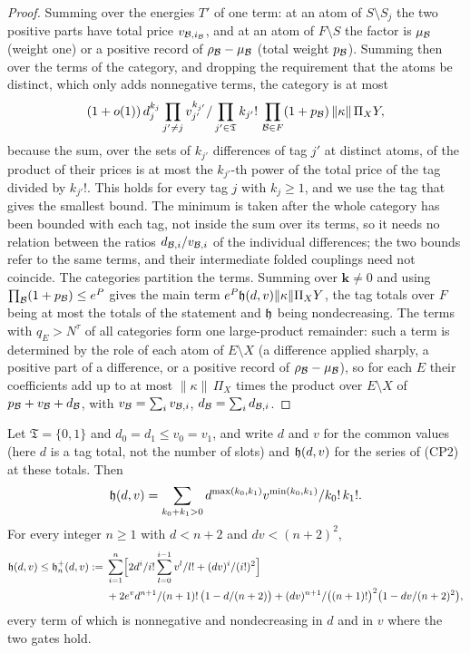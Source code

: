 \begin{proof}
Summing over the energies $T'$ of one term: at an atom of $S\setminus S_j$
the two positive parts have total price $v_{\mathcal B,i_\mathcal B}$, and at an atom of
$F\setminus S$ the factor is $\mu_\mathcal B$ (weight one) or a positive record of
$\rho_\mathcal B-\mu_\mathcal B$ (total weight $p_\mathcal B$). Summing then over the terms of
the category, and dropping the requirement that the atoms be distinct, which
only adds nonnegative terms, the category is at most
\[
 (1+o(1))\,d_j^{k_j}\prod_{j'\ne j}v_{j'}^{k_{j'}}/\prod_{j'\in\mathfrak T}k_{j'}!\,\prod_{\mathcal B\in F}(1+p_\mathcal B)\,
 \|\kappa\|\,\Pi_XY ,
\]
because the sum, over the sets of $k_{j'}$ differences of tag $j'$ at
distinct atoms, of the product of their prices is at most the $k_{j'}$-th
power of the total price of the tag divided by $k_{j'}!$. This holds for
every tag $j$ with $k_j\ge1$, and we use the tag that gives the smallest
bound. The minimum is taken after the whole category has been bounded with
each tag, not inside the sum over its terms, so it needs no relation between
the ratios $d_{\mathcal B,i}/v_{\mathcal B,i}$ of the individual differences; the two
bounds refer to the same terms, and their intermediate folded couplings need
not coincide. The categories partition the terms. Summing over
$\boldsymbol k\ne0$ and using $\prod_\mathcal B(1+p_\mathcal B)\le e^P$ gives the main
term $e^P\mathfrak h(d,v)\|\kappa\|\Pi_XY$, the tag totals over $F$ being at most
the totals of the statement and $\mathfrak h$ being nondecreasing. The terms with
$q_E>N^\tau$ of all categories form one large-product remainder: such a term
is determined by the role of each atom of $E\setminus X$ (a difference
applied sharply, a positive part of a difference, or a positive record of
$\rho_\mathcal B-\mu_\mathcal B$), so for each $E$ their coefficients add up to at most
$\|\kappa\|\,\Pi_X$ times the product over $E\setminus X$ of
$p_\mathcal B+v_\mathcal B+d_\mathcal B$, with $v_\mathcal B=\sum_iv_{\mathcal B,i}$, $d_\mathcal B=\sum_id_{\mathcal B,i}$.
\end{proof}

\begin{corollary}\label{cor:two-cut-series}
Let $\mathfrak T=\{0,1\}$ and $d_0=d_1\le v_0=v_1$, and write $d$ and $v$ for
the common values (here $d$ is a tag total, not the number of slots) and
$\mathfrak h(d,v)$ for the series of (CP2) at these totals. Then
\[
 \mathfrak h(d,v)=\sum_{k_0+k_1>0}d^{\max(k_0,k_1)}v^{\min(k_0,k_1)}/k_0!\,k_1!.
\]
For every integer $n\ge1$ with $d<n+2$ and $dv<(n+2)^2$,
\begin{align*}
 \mathfrak h(d,v)\le\mathfrak h_n^+(d,v):={}&\sum_{i=1}^{n}\Bigl[2d^i/i!
 \sum_{l=0}^{i-1}v^l/l!+(dv)^i/(i!)^2\Bigr]\\
 &+2e^vd^{n+1}/(n+1)!\,\bigl(1-d/(n+2)\bigr)
 +(dv)^{n+1}/\bigl((n+1)!\bigr)^2\bigl(1-dv/(n+2)^2\bigr),
\end{align*}
every term of which is nonnegative and nondecreasing in $d$ and in $v$ where
the two gates hold.
\end{corollary}

